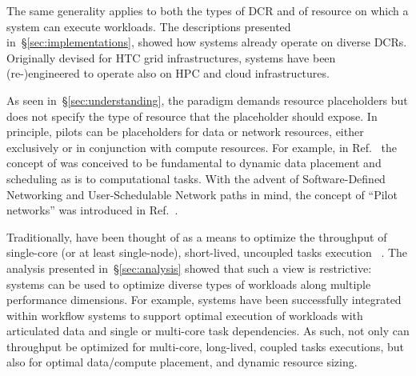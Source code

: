 \documentclass{sig-alternate}
\begin{document}
The same generality applies to both the types of DCR and of resource on which a
\pilot system can execute workloads. The descriptions presented
in~\S\ref{sec:implementations}, showed how \pilot systems already operate on
diverse DCRs. Originally devised for HTC grid infrastructures, \pilot systems
have been (re-)engineered to operate also on HPC and cloud infrastructures.

As seen in~\S\ref{sec:understanding}, the \pilot paradigm demands resource
placeholders but does not specify the type of resource that the placeholder
should expose. In principle, pilots can be placeholders for data or network
resources, either exclusively or in conjunction with compute resources.  For
example, in Ref.~\cite{luckow2014pilot} the concept of \pilotdata was conceived
to be fundamental to dynamic data placement and scheduling as \pilot is to
computational tasks.  With the advent of Software-Defined Networking and
User-Schedulable Network paths in mind, the concept of ``Pilot networks'' was
introduced in Ref.~\cite{santcroos2012}.





Traditionally, \pilots have been thought of as a means to optimize the
throughput of single-core (or at least single-node), short-lived, uncoupled
tasks execution ~\cite{pordes2007,sfiligoi2009,juve2010}. The analysis presented
in~\S\ref{sec:analysis} showed that such a view is restrictive: \pilot systems
can be used to optimize diverse types of workloads along multiple performance
dimensions. For example, \pilot systems have been successfully integrated within
workflow systems to support optimal execution of workloads with articulated data
and single or multi-core task dependencies. As such, not only can throughput be
optimized for multi-core, long-lived, coupled tasks executions, but also for optimal
data/compute placement, and dynamic resource sizing.
\end{document}
